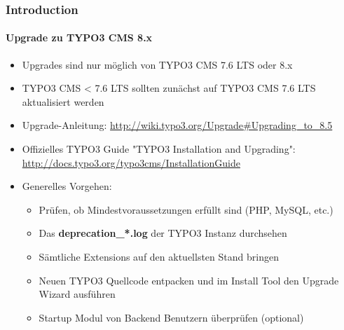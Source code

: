 \begin{frame}[fragile]
	\frametitle{Introduction}
	\framesubtitle{Upgrade zu TYPO3 CMS 8.x}

	\begin{itemize}
		\item Upgrades sind nur möglich von TYPO3 CMS 7.6 LTS oder 8.x
		\item TYPO3 CMS < 7.6 LTS sollten zunächst auf TYPO3 CMS 7.6 LTS aktualisiert werden
	\end{itemize}

	\begin{itemize}

		\item Upgrade-Anleitung:\newline
			\smaller\url{http://wiki.typo3.org/Upgrade#Upgrading_to_8.5}\normalsize
		\item Offizielles TYPO3 Guide "TYPO3 Installation and Upgrading":
			\smaller\url{http://docs.typo3.org/typo3cms/InstallationGuide}\normalsize
		\item Generelles Vorgehen:
			\begin{itemize}
				\item Prüfen, ob Mindestvoraussetzungen erfüllt sind \small(PHP, MySQL, etc.)
				\item Das \textbf{deprecation\_*.log} der TYPO3 Instanz durchsehen
				\item Sämtliche Extensions auf den aktuellsten Stand bringen
				\item Neuen TYPO3 Quellcode entpacken und im Install Tool den Upgrade Wizard ausführen
				\item Startup Modul von Backend Benutzern überprüfen (optional)
			\end{itemize}
	\end{itemize}

\end{frame}


